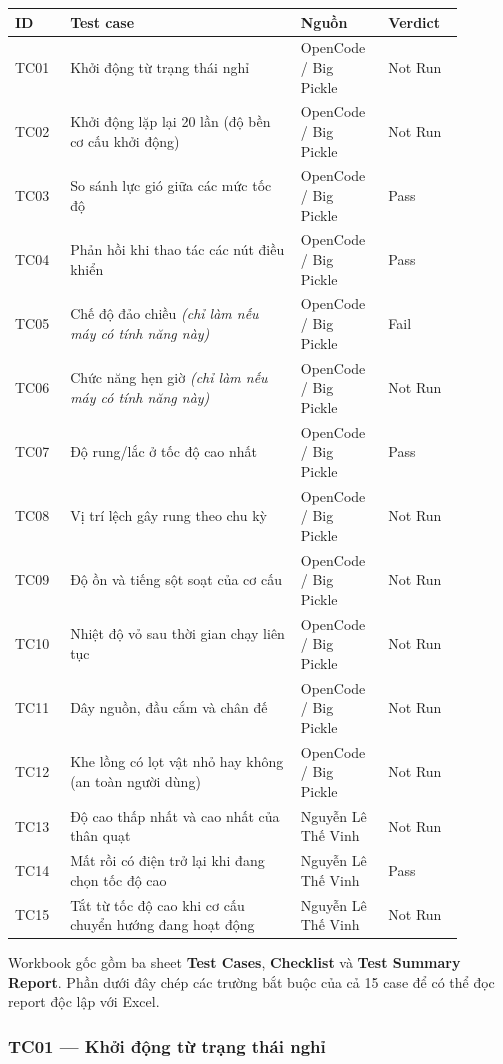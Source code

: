{\def\LTcaptype{none} %
\begin{longtable}[]{@{}p{0.11\linewidth}p{0.46\linewidth}p{0.17\linewidth}p{0.15\linewidth}@{}}
\toprule\noalign{}
ID & Test case & Nguồn & Verdict \\
\midrule\noalign{}
\endhead
\bottomrule\noalign{}
\endlastfoot
TC01 & Khởi động từ trạng thái nghỉ & OpenCode / Big Pickle & Not Run \\
TC02 & Khởi động lặp lại 20 lần (độ bền cơ cấu khởi động) & OpenCode / Big Pickle & Not Run \\
TC03 & So sánh lực gió giữa các mức tốc độ & OpenCode / Big Pickle & Pass \\
TC04 & Phản hồi khi thao tác các nút điều khiển & OpenCode / Big Pickle & Pass \\
TC05 & Chế độ đảo chiều \emph{(chỉ làm nếu máy có tính năng này)} & OpenCode / Big Pickle & Fail \\
TC06 & Chức năng hẹn giờ \emph{(chỉ làm nếu máy có tính năng này)} & OpenCode / Big Pickle & Not Run \\
TC07 & Độ rung/lắc ở tốc độ cao nhất & OpenCode / Big Pickle & Pass \\
TC08 & Vị trí lệch gây rung theo chu kỳ & OpenCode / Big Pickle & Not Run \\
TC09 & Độ ồn và tiếng sột soạt của cơ cấu & OpenCode / Big Pickle & Not Run \\
TC10 & Nhiệt độ vỏ sau thời gian chạy liên tục & OpenCode / Big Pickle & Not Run \\
TC11 & Dây nguồn, đầu cắm và chân đế & OpenCode / Big Pickle & Not Run \\
TC12 & Khe lồng có lọt vật nhỏ hay không (an toàn người dùng) & OpenCode / Big Pickle & Not Run \\
TC13 & Độ cao thấp nhất và cao nhất của thân quạt & Nguyễn Lê Thế Vinh & Not Run \\
TC14 & Mất rồi có điện trở lại khi đang chọn tốc độ cao & Nguyễn Lê Thế Vinh & Pass \\
TC15 & Tắt từ tốc độ cao khi cơ cấu chuyển hướng đang hoạt động & Nguyễn Lê Thế Vinh & Not Run \\
\end{longtable}
}

Workbook gốc gồm ba sheet \textbf{Test Cases}, \textbf{Checklist} và \textbf{Test Summary Report}. Phần dưới đây chép các trường bắt buộc của cả 15 case để có thể đọc report độc lập với Excel.

\subsubsection{TC01 --- Khởi động từ trạng thái nghỉ}\label{tc01-khux1edfi-ux111ux1ed9ng-tux1eeb-trux1ea1ng-thuxe1i-nghux1ec9}

